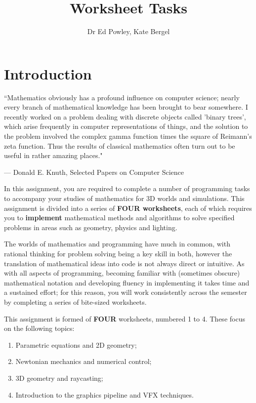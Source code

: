\documentclass{../../fal_assignment}
\title{Worksheet Tasks}
\author{Dr Ed Powley, Kate Bergel}
\begin{document}
\maketitle

\section*{Introduction}

\begin{marginquote}
``Mathematics obviously has a profound influence on computer science; nearly every branch of mathematical knowledge has been brought to bear somewhere. I recently worked on a problem dealing with discrete objects called 'binary trees', which arise frequently in computer representations of things, and the solution to the problem involved the complex gamma function times the square of  Reimann's zeta function. Thus the results of classical mathematics often turn out to be useful in rather amazing places."

\par --- Donald E. Knuth, Selected Papers on Computer Science
\end{marginquote}

In this assignment, you are required to complete a number of programming tasks to accompany your studies of mathematics for 3D worlds and simulations. This assignment is divided into a series of \textbf{FOUR worksheets}, each of which requires you to \textbf{implement} mathematical methods and algorithms to solve specified problems in areas such as geometry, physics and lighting.

The worlds of mathematics and programming have much in common, with rational thinking for problem solving being a key skill in both, however the translation of mathematical ideas into code is not always direct or intuitive. As with all aspects of programming, becoming familiar with (sometimes obscure) mathematical notation and developing fluency in implementing it takes time and a sustained effort; for this reason, you will work consistently across the semester by completing a series of bite-sized worksheets.

This assignment is formed of \textbf{FOUR} worksheets, numbered 1 to 4.
These focus on the following topics:
\begin{enumerate}[label=\arabic*)]
	\item Parametric equations and 2D geometry;
	\item Newtonian mechanics and numerical control;
	\item 3D geometry and raycasting;
	\item Introduction to the graphics pipeline and VFX techniques.
\end{enumerate}
\end{document}
